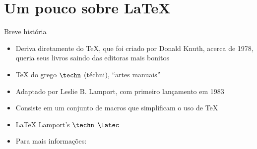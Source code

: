 
\section[Sobre \LaTeX]{Um pouco sobre \LaTeX}
	\begin{frame}{Breve história}
		\begin{itemize}[<+->]
			\item Deriva diretamente do \TeX{}, que foi criado por Donald Knuth, acerca de 1978, queria seus livros saindo das editoras mais bonitos
			\item \TeX{} \textrightarrow{} do grego $\techn$ (téchni), ``artes manuais''
			\item Adaptado por Leslie B. Lamport, com primeiro lançamento em 1983
			\item Consiste em um conjunto de macros que simplificam o uso de \TeX{}
			\item \LaTeX{} \textrightarrow{}  Lamport's $\techn$ \textrightarrow{} $\latec$
			\item Para mais informações: 
		\end{itemize}
	\end{frame}

